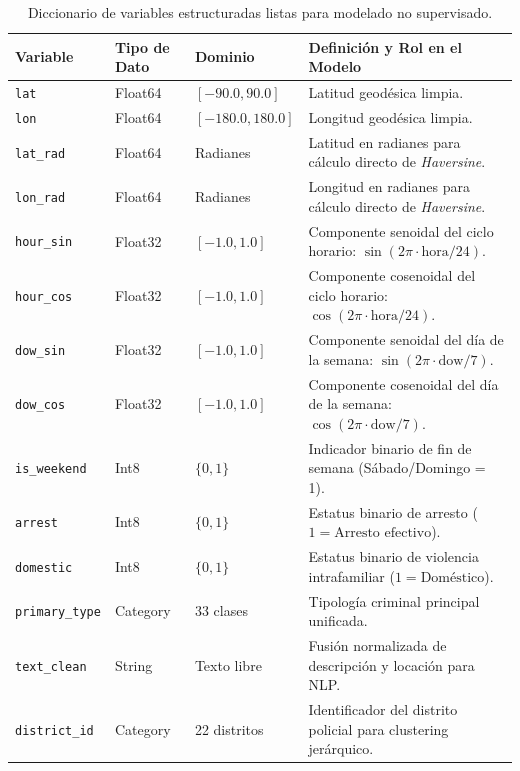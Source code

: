 \begin{table}[htbp]
\centering
\small
\begin{tabularx}{\textwidth}{l p{3.5cm} l X}
\toprule
\textbf{Variable} & \textbf{Tipo de Dato} & \textbf{Dominio} & \textbf{Definición y Rol en el Modelo} \\
\midrule
\texttt{lat} & Float64 & $[-90.0, 90.0]$ & Latitud geodésica limpia. \\
\texttt{lon} & Float64 & $[-180.0, 180.0]$ & Longitud geodésica limpia. \\
\texttt{lat\_rad} & Float64 & Radianes & Latitud en radianes para cálculo directo de \textit{Haversine}. \\
\texttt{lon\_rad} & Float64 & Radianes & Longitud en radianes para cálculo directo de \textit{Haversine}. \\
\texttt{hour\_sin} & Float32 & $[-1.0, 1.0]$ & Componente senoidal del ciclo horario: $\sin(2\pi \cdot \text{hora}/24)$. \\
\texttt{hour\_cos} & Float32 & $[-1.0, 1.0]$ & Componente cosenoidal del ciclo horario: $\cos(2\pi \cdot \text{hora}/24)$. \\
\texttt{dow\_sin} & Float32 & $[-1.0, 1.0]$ & Componente senoidal del día de la semana: $\sin(2\pi \cdot \text{dow}/7)$. \\
\texttt{dow\_cos} & Float32 & $[-1.0, 1.0]$ & Componente cosenoidal del día de la semana: $\cos(2\pi \cdot \text{dow}/7)$. \\
\texttt{is\_weekend} & Int8 & $\{0, 1\}$ & Indicador binario de fin de semana (Sábado/Domingo = 1). \\
\texttt{arrest} & Int8 & $\{0, 1\}$ & Estatus binario de arresto ($1 = \text{Arresto efectivo}$). \\
\texttt{domestic} & Int8 & $\{0, 1\}$ & Estatus binario de violencia intrafamiliar ($1 = \text{Doméstico}$). \\
\texttt{primary\_type} & Category & 33 clases & Tipología criminal principal unificada. \\
\texttt{text\_clean} & String & Texto libre & Fusión normalizada de descripción y locación para NLP. \\
\texttt{district\_id} & Category & 22 distritos & Identificador del distrito policial para clustering jerárquico. \\
\bottomrule
\end{tabularx}
\caption{Diccionario de variables estructuradas listas para modelado no supervisado.}
\label{tab:diccionario_limpio}
\end{table}

